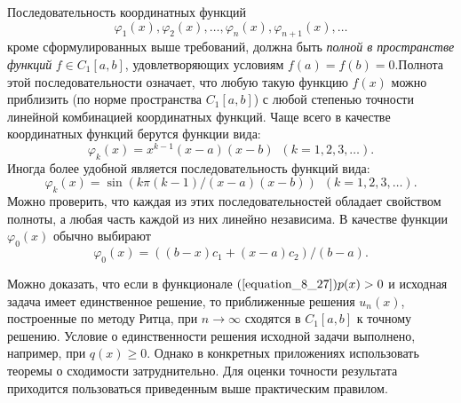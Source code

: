 	\newpage
	Последовательность координатных функций
	$$\varphi_1 (x),\varphi_2 (x),\dots ,\varphi_n (x),\varphi_{n+1} (x),\dots$$
	кроме сформулированных выше требований, должна быть {\it полной в пространстве функций} $f\in C_1[a, b]$, удовлетворяющих условиям $f(a)=f(b)=0$.Полнота этой последовательности означает, что любую такую функцию $f(x)$ можно приблизить (по норме пространства $C_1[a,b]$) с любой степенью точности линейной комбинацией координатных функций. Чаще всего в качестве координатных функций берутся функции вида:
	\begin{equation}
	\label{equation_8_28}
		\varphi_k (x)=x^{k-1}(x-a)(x-b)\,\,\, (k=1,2,3,\dots ).
	\end{equation}
	Иногда более удобной является последовательность функций вида:
	\begin{equation}
	\label{equation_8_29}
		\varphi_k (x)=\sin{(k\pi (k-1)/(x-a)(x-b))}\,\,\, (k=1,2,3,\dots ).
	\end{equation}
	Можно проверить, что каждая из этих последовательностей обладает свойством полноты, а любая часть каждой из них линейно независима. В качестве функции $\varphi_0(x)$ обычно выбирают
	\begin{equation}
	\label{equation_8_30}
		\varphi_0 (x)=((b-x)c_1 +(x-a)c_2)/(b-a).
	\end{equation}

	Можно доказать, что если в функционале $(\ref{equation_8_27})  p(x)>0$ и исходная задача имеет единственное решение, то приближенные решения $u_n(x)$, построенные по методу Ритца, при $n\to \infty$ сходятся в $C_1[a, b]$ к точному решению. Условие о единственности решения исходной задачи выполнено, например, при $q(x)\ge 0$. Однако в конкретных приложениях использовать теоремы о сходимости затруднительно. Для оценки точности результата приходится пользоваться приведенным выше практическим правилом.

